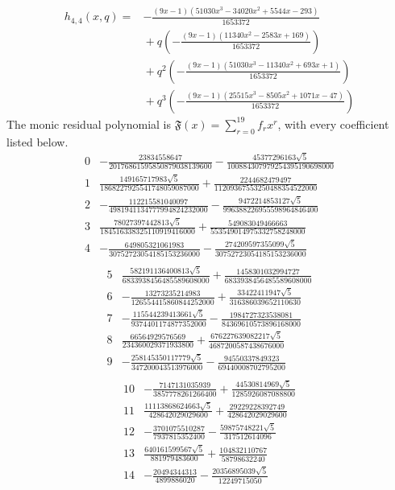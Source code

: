 \documentclass[11pt]{article}
\begin{document}
\[
\begin{split}
h_{4,4}(x,q)={}&- \frac{\left(9 x - 1\right) \left(51030 x^{3} - 34020 x^{2} + 5544 x - 293\right)}{1653372}\\
&{}+q\left(- \frac{\left(9 x - 1\right) \left(11340 x^{2} - 2583 x + 169\right)}{1653372}\right)\\
&{}+q^{2}\left(- \frac{\left(9 x - 1\right) \left(51030 x^{3} - 11340 x^{2} + 693 x + 1\right)}{1653372}\right)\\
&{}+q^{3}\left(- \frac{\left(9 x - 1\right) \left(25515 x^{3} - 8505 x^{2} + 1071 x - 47\right)}{1653372}\right)
\end{split}
\tag{ANP28}
\]
The monic residual polynomial is $\mathfrak F(x)=\sum_{r=0}^{19}f_rx^r$, with every coefficient listed below.
\[
\begin{array}{c|l}
0&- \frac{23834558647}{20176861595850879038139600} - \frac{45377296163 \sqrt{5}}{100884307979254395190698000}\\
1&\frac{149165717983 \sqrt{5}}{1868227925541748059087000} + \frac{2244682479497}{11209367553250488354522000}\\
2&- \frac{112215581040097}{4981941134777994824232000} - \frac{9472214853127 \sqrt{5}}{996388226955598964846400}\\
3&\frac{78027397442813 \sqrt{5}}{184516338325110919416000} + \frac{549083049466663}{553549014975332758248000}\\
4&- \frac{649805321061983}{30752723054185153236000} - \frac{274209597355099 \sqrt{5}}{30752723054185153236000}\\
\end{array}
\tag{ANP29}
\]
\[
\begin{array}{c|l}
5&\frac{582191136400813 \sqrt{5}}{6833938456485589608000} + \frac{1458301032994727}{6833938456485589608000}\\
6&- \frac{13273235214983}{126554415860844252000} + \frac{33422411947 \sqrt{5}}{316386039652110630}\\
7&- \frac{115544239413661 \sqrt{5}}{9374401174877352000} - \frac{1984727323538081}{84369610573896168000}\\
8&\frac{66564929576569}{234360029371933800} + \frac{676227639082217 \sqrt{5}}{4687200587438676000}\\
9&- \frac{258145350117779 \sqrt{5}}{347200043513976000} - \frac{94550337849323}{69440008702795200}\\
\end{array}
\tag{ANP30}
\]
\[
\begin{array}{c|l}
10&- \frac{7147131035939}{3857778261266400} + \frac{44530814969 \sqrt{5}}{1285926087088800}\\
11&\frac{11113868624663 \sqrt{5}}{428642029029600} + \frac{29229228392749}{428642029029600}\\
12&- \frac{3701075510287}{7937815352400} - \frac{59875748221 \sqrt{5}}{317512614096}\\
13&\frac{640161599567 \sqrt{5}}{881979483600} + \frac{104832110767}{58798632240}\\
14&- \frac{20494344313}{4899886020} - \frac{20356895039 \sqrt{5}}{12249715050}\\
\end{array}
\tag{ANP31}
\]
\end{document}
